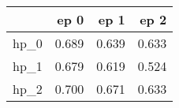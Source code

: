 \begin{tabular}{lrrr}
\toprule
{} &   ep 0 &   ep 1 &   ep 2 \\
\midrule
hp\_0 &  0.689 &  0.639 &  0.633 \\
hp\_1 &  0.679 &  0.619 &  0.524 \\
hp\_2 &  0.700 &  0.671 &  0.633 \\
\bottomrule
\end{tabular}
